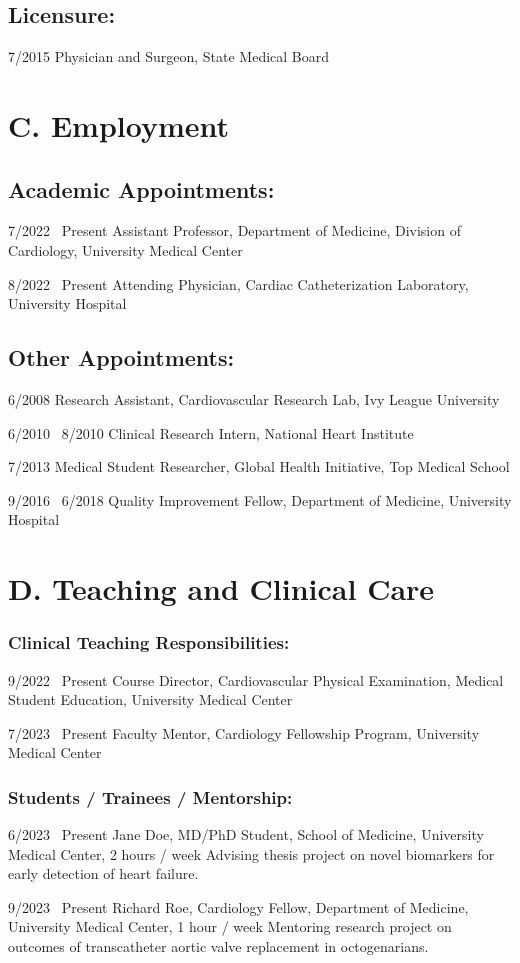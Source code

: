 \documentclass{article}
\newcommand{\cvsection}[1]{\section*{\rmfamily#1}}
\newcommand{\cvsubsection}[1]{\subsection*{\rmfamily\hspace{1.5em}#1}}
\newcommand{\cvsubsubsection}[1]{\subsubsection*{\rmfamily\hspace{1em}#1}}
\newcommand{\myliststart}{\begin{description}[font=\normalfont,
    labelindent=2em,leftmargin=10em,style=nextline]}
\newcommand{\mylistend}{\end{description}}
\begin{document}
\cvsubsection{Licensure:}
\myliststart
\item[7/2015] Physician and Surgeon, State Medical Board
\mylistend



\cvsection{C. Employment}

\cvsubsection{Academic Appointments:}

\myliststart
\item[7/2022 \textendash~Present] Assistant Professor, Department of Medicine, Division of Cardiology, University Medical Center
\item[8/2022 \textendash~Present] Attending Physician, Cardiac Catheterization Laboratory, University Hospital
\mylistend

\cvsubsection{Other Appointments:}

\myliststart
\item[6/2008]	Research Assistant, Cardiovascular Research Lab, Ivy League University
\item[6/2010 \textendash~8/2010]	Clinical Research Intern, National Heart Institute
\item[7/2013]	Medical Student Researcher, Global Health Initiative, Top Medical School
\item[9/2016 \textendash~6/2018]	Quality Improvement Fellow, Department of Medicine, University Hospital
\mylistend



\cvsection{D. Teaching and Clinical Care}

\cvsubsubsection{Clinical Teaching Responsibilities:}

\myliststart
\item[9/2022 \textendash~Present] Course Director, Cardiovascular Physical Examination, Medical Student Education, University Medical Center
\item[7/2023 \textendash~Present] Faculty Mentor, Cardiology Fellowship Program, University Medical Center
\mylistend


\cvsubsubsection{Students / Trainees / Mentorship:}
\myliststart
\item[6/2023 \textendash~Present]	Jane Doe, MD/PhD Student, School of Medicine, University Medical Center, 2 hours / week
Advising thesis project on novel biomarkers for early detection of heart failure.
\item[9/2023 \textendash~Present]	Richard Roe, Cardiology Fellow, Department of Medicine, University Medical Center, 1 hour / week
Mentoring research project on outcomes of transcatheter aortic valve replacement in octogenarians.
\mylistend
\end{document}
